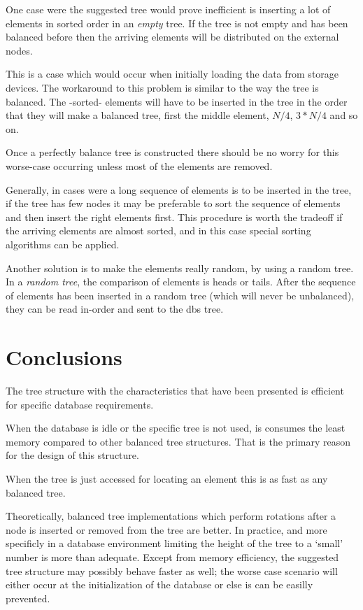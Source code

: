 \documentclass[twocolumn]{article}
\begin{document}
One case were the suggested tree would prove inefficient is inserting a lot
of elements in sorted order in an \emph{empty} tree.
If the tree is not empty and has been balanced before then the arriving
elements will be distributed on the external nodes.

This is a case which would occur when initially loading the data from
storage devices. The workaround to this problem is similar to the way the
tree is balanced. The -sorted- elements will have to be inserted in the tree
in the order that they will make a balanced tree, first the middle element,
$N/4$, $3*N/4$ and so on.

Once a perfectly balance tree is constructed there should be no worry for
this worse-case occurring unless most of the elements are removed.

Generally, in cases were a long sequence of elements is to be inserted
in the tree, if the tree has few nodes it may be preferable to sort the
sequence of elements and then insert the right elements first.
This procedure is worth the tradeoff if the arriving elements are almost
sorted, and in this case special sorting algorithms can be applied.

Another solution is to make the elements really random, by using a random
tree. In a \emph{random tree}, the comparison of elements is heads or tails.
After the sequence of elements has been inserted in a random tree (which
will never be unbalanced), they can be read in-order and sent to the dbs
tree.

\section{Conclusions}

The tree structure with the characteristics that have been presented is
efficient for specific database requirements.

When the database is idle or the specific tree is not used, is consumes the
least memory compared to other balanced tree structures.
That is the primary reason for the design of this structure.

When the tree is just accessed for locating an element this is as fast as
any balanced tree.

Theoretically, balanced tree implementations which perform rotations after
a node is inserted or removed from the tree are better. In practice, and
more specificly in a database environment limiting the height of the tree to
a `small' number is more than adequate.
Except from memory efficiency, the suggested tree structure may possibly
behave faster as well; the worse case scenario will either occur at the
initialization of the database or else is can be easilly prevented.
\end{document}
